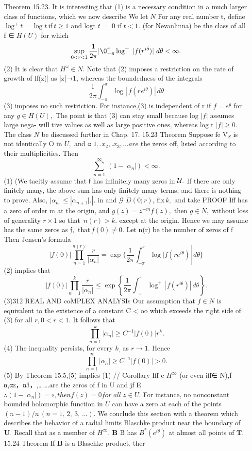 Theorem 15.23. It is interesting that (1) is a necessary condition in a much larger class of functions, which we now describe We let ${\mathbf{}}N$ For any real number t, define $\log^{+}t=\log t{\mathrm{~if~}}t\geq1$ and logt $\scriptstyle t\,=\,0$ if $t<1.$ (for Nevanlinna) be the class of all f ∈ $H(U)$ for which $$ \operatorname*{sup}_{0<r<1}\frac{1}{2\pi} |\O_{-\pi}^{\pi}\log^{+}\ |f(r^{i\delta})|\ d\theta<\infty. $$ (2) It is clear that $H^{\omega}\in N.$ Note that (2) imposes a restriction on the rate of growth of lf(z)| as |z|→1, whereas the boundedness of the integrals $$ {\frac{1}{2\pi}}\int_{-\pi}^{\pi}\log\left|\,f(r e^{i\theta})\right|\,d\theta $$ (3) imposes no such restriction. For instance,(3) is independent of r if $f=e^{g}$ for any $g\in H(U),$ The point is that (3) can stay small because log $|f|$ assumes large nega- will tive values as well as large positive ones, whereas log t $|f|\geq0.$ The class ${\mathbf{}}N$ be discussed further in Chap. 17. 15.23 Theorem Suppose fe $\scriptstyle\mathrm{V}_{S}$ is not identically O in $U,$ and α $1, .x_{2}, .x_{3},\ldots a r e$ the zeros off, listed according to their multiplicities. Then $$ \sum_{n=1}^{\infty}\,(1-|\alpha_{n}|)<\infty. $$ (1) (We tacitly assume that $\boldsymbol{\mathsf{f}}$ has infinitely many zeros in ${\cal U}.$ If there are only finitely many, the above sum has only finitely many terms, and there is nothing to prove. Also, $\left|\alpha_{n}\right|\leq\left|\alpha_{n+1} |.\right|.$ in and $\scriptstyle{\mathcal{G}}$ ${\tilde{D}}(0;r),\,{\mathrm{fix}}\,k,$ and take PROOF Iff has a zero of order m at the origin, and $g(z)=z^{-m}f(z),$ then $g\in N,$ without loss of generality $\scriptstyle r\times1$ so that $\,n(r)>k.$ except at the origin. Hence we may assume has the same zeros as ${\mathfrak{f}},$ ${\mathrm{that}}\,f(0)\neq0.$ Let n(r) be the number of zeros of f Then Jensen's formula $$ |f(0)|\prod_{n=1}^{n(r)}\frac{r}{|\alpha_{n}|}=\exp\left. \lbrace\frac{1}{2\pi}\int_{-\pi}^{\pi}\log |f(r e^{i\theta})\right|\,d\theta \rbrace $$ (2) implies that $$ |f(0)|\prod_{n=1}^{k}{\frac{r}{|\alpha_{n}|}}\leq\exp\left\{{\frac{1}{2\pi}}\int_{-\pi}^{\pi}\log^{+}\,|f(r^{i\theta})|\,d\theta\right\}. $$ (3)312 REAL AND coMPLEX ANALYSIs Our assumption that $f\in N$ is equivalent to the existence of a constant C < oo which exceeds the right side of (3) for all $r,0<r<1.$ It follows that $$ \prod_{n=1}^{k}|\alpha_{n}|\geq C^{-1}|f(0)|r^{k}. $$ (4) The inequality persists, for every $k_{\mathrm{{,}}}$ as $r\to1.$ Hence $$ \prod_{n=1}^{\infty}|\alpha_{n}|\geq C^{-1}|f(0)|>0. $$ (5) By Theorem 15.5,(5) implies (1) // Corollary Iff e $H^{\infty}$ (or even iff∈ N),f α,αz，α3，,…….are the zeros of f in U and jf E $\therefore(1-|\alpha_{n}|)=\circ,t h e n f(z)=0f o r\;a l l\;z\in U.$ For instance, no nonconstant bounded holomorphic function in $U$ can have a zero at each of the points $(n-1)/n\,(n=1,\,2,\,3,\,\ldots).$ We conclude this section with a theorem which describes the behavior of a radial limits Blaschke product near the boundary of ${\boldsymbol{U}}.$ Recall that as a member of $H^{\infty}.$ $\boldsymbol{B}$ B has $B^{*}(e^{i\theta})$ at almost all points of ${\boldsymbol{T}}.$ 15.24 Theorem If $\boldsymbol{B}$ is a Blaschke product, ther 